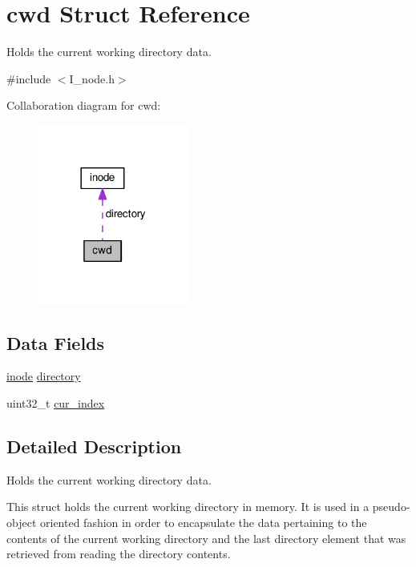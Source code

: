 \hypertarget{structcwd}{\section{cwd Struct Reference}
\label{structcwd}
}


Holds the current working directory data.  




{\ttfamily \#include $<$I\-\_\-node.\-h$>$}



Collaboration diagram for cwd\-:
\nopagebreak
\begin{figure}[H]
\begin{center}
\leavevmode
\includegraphics[width=141pt]{structcwd__coll__graph}
\end{center}
\end{figure}
\subsection*{Data Fields}
\begin{DoxyCompactItemize}
\item 
\hyperlink{structinode}{inode} \hyperlink{structcwd_a09a79f07c0f19843fbe3e5277106c8db}{directory}
\item 
uint32\-\_\-t \hyperlink{structcwd_af9f19a44a251a4b45c3e949b698b9294}{cur\-\_\-index}
\end{DoxyCompactItemize}


\subsection{Detailed Description}
Holds the current working directory data. 

This struct holds the current working directory in memory. It is used in a pseudo-\/object oriented fashion in order to encapsulate the data pertaining to the contents of the current working directory and the last directory element that was retrieved from reading the directory contents.

